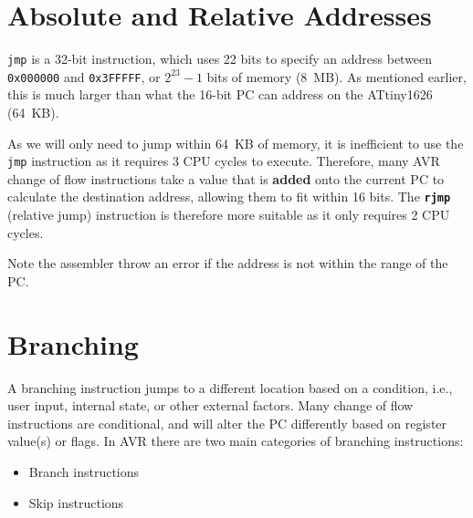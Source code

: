 \documentclass[a4paper]{report}
\newcommand{\keywordinline}[1]{\textcolor[rgb]{0.00,0.50,0.00}{\textbf{\texttt{#1}}}}
\begin{document}
\section{Absolute and Relative Addresses}
\texttt{jmp} is a 32-bit instruction, which uses 22 bits to specify an address between \texttt{0x000000} %
and \texttt{0x3FFFFF}, or \(2^{23} - 1\) bits of memory (\qty{8}{MB}). As mentioned earlier, this is much larger %
than what the 16-bit PC can address on the ATtiny1626 (\qty{64}{KB}).

As we will only need to jump within \qty{64}{KB} of memory, it is inefficient to use the \texttt{jmp} instruction as it
requires 3 CPU cycles to execute. Therefore, many AVR change of flow instructions take a value that is
\textbf{added} onto the current PC to calculate the destination address, allowing them to fit within 16 bits.
The \keywordinline{rjmp} (relative jump) instruction is therefore more suitable as it only requires 2
CPU cycles.

Note the assembler throw an error if the address is not within the range of the PC\@.
\section{Branching}
A branching instruction jumps to a different location based on a condition, i.e., user input, internal state, or other external factors.
Many change of flow instructions are conditional, and will alter the PC differently based on register value(s) or flags.
In AVR there are two main categories of branching instructions:
\begin{itemize}
    \item Branch instructions
    \item Skip instructions
\end{itemize}
\end{document}
